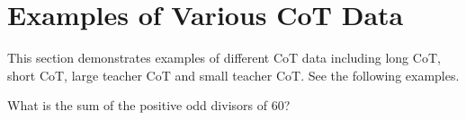 \section{Examples of Various CoT Data}\label{app:example}
This section demonstrates examples of different CoT data including long CoT, short CoT, large teacher CoT and small teacher CoT. See the following examples.


\begin{figure*}[htbp]
    \centering
\begin{tcolorbox}[title=Problem, promptstyle]
\lstset{
    basicstyle=\normalfont\sffamily\footnotesize,
    breaklines=true,
    frame=none,
    columns=fullflexible,
}
What is the sum of the positive odd divisors of $60$?
\end{tcolorbox}
    
\end{figure*}



